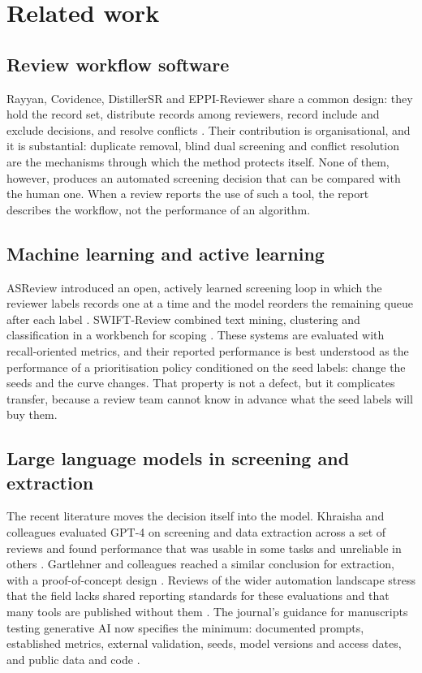 \section{Related work}\label{sec:related}

\subsection{Review workflow software}

Rayyan, Covidence, DistillerSR and EPPI-Reviewer share a common design: they
hold the record set, distribute records among reviewers, record include and
exclude decisions, and resolve conflicts
\autocite{Ouzzani_2016,Marshall_2019}. Their contribution is organisational,
and it is substantial: duplicate removal, blind dual screening and conflict
resolution are the mechanisms through which the method protects itself. None
of them, however, produces an automated screening decision that can be
compared with the human one. When a review reports the use of such a tool, the
report describes the workflow, not the performance of an algorithm.

\subsection{Machine learning and active learning}

ASReview introduced an open, actively learned screening loop in which the
reviewer labels records one at a time and the model reorders the remaining
queue after each label \autocite{van_de_Schoot_2021}. SWIFT-Review combined
text mining, clustering and classification in a workbench for scoping
\autocite{Howard_2016}. These systems are evaluated with recall-oriented
metrics, and their reported performance is best understood as the performance
of a prioritisation policy conditioned on the seed labels: change the seeds
and the curve changes. That property is not a defect, but it complicates
transfer, because a review team cannot know in advance what the seed labels
will buy them.

\subsection{Large language models in screening and extraction}

The recent literature moves the decision itself into the model. Khraisha and
colleagues evaluated GPT-4 on screening and data extraction across a set of
reviews and found performance that was usable in some tasks and unreliable in
others \autocite{Khraisha_2024}. Gartlehner and colleagues reached a similar
conclusion for extraction, with a proof-of-concept design
\autocite{Gartlehner_2024}. Reviews of the wider automation landscape stress
that the field lacks shared reporting standards for these evaluations and that
many tools are published without them \autocite{Callaghan_2024}. The journal's
guidance for manuscripts testing generative AI now specifies the minimum:
documented prompts, established metrics, external validation, seeds, model
versions and access dates, and public data and code \autocite{Farotimi_2025}.


